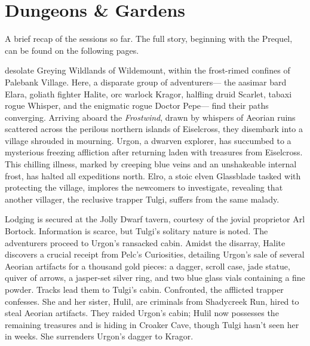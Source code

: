 \documentclass[
  letterpaper,12pt,twoside,twocolumn,openany,
  nodeprecatedcode,bg=full]{dndbook}
\author{}
\date{}
\begin{document}
\chapter{Dungeons \& Gardens}\label{dungeons-gardens}

\begin{DndComment}{}
A brief recap of the sessions so far. The full story, beginning with the
Prequel, can be found on the following pages.
\end{DndComment}

 desolate Greying Wildlands
of Wildemount, within the frost-rimed confines of Palebank Village.
Here, a disparate group of adventurers--- the aasimar bard Elara,
goliath fighter Halite, orc warlock Kragor, halfling druid Scarlet,
tabaxi rogue Whisper, and the enigmatic rogue Doctor Pepe--- find their
paths converging. Arriving aboard the \emph{Frostwind}, drawn by
whispers of Aeorian ruins scattered across the perilous northern islands
of Eiselcross, they disembark into a village shrouded in mourning.
Urgon, a dwarven explorer, has succumbed to a mysterious freezing
affliction after returning laden with treasures from Eiselcross. This
chilling illness, marked by creeping blue veins and an unshakeable
internal frost, has halted all expeditions north. Elro, a stoic elven
Glassblade tasked with protecting the village, implores the newcomers to
investigate, revealing that another villager, the reclusive trapper
Tulgi, suffers from the same malady.

Lodging is secured at the Jolly Dwarf tavern, courtesy of the jovial
proprietor Arl Bortock. Information is scarce, but Tulgi's solitary
nature is noted. The adventurers proceed to Urgon's ransacked cabin.
Amidst the disarray, Halite discovers a crucial receipt from Pelc's
Curiosities, detailing Urgon's sale of several Aeorian artifacts for a
thousand gold pieces: a dagger, scroll case, jade statue, quiver of
arrows, a jasper-set silver ring, and two blue glass vials containing a
fine powder. Tracks lead them to Tulgi's cabin. Confronted, the
afflicted trapper confesses. She and her sister, Hulil, are criminals
from Shadycreek Run, hired to steal Aeorian artifacts. They raided
Urgon's cabin; Hulil now possesses the remaining treasures and is hiding
in Croaker Cave, though Tulgi hasn't seen her in weeks. She surrenders
Urgon's dagger to Kragor.
\end{document}
